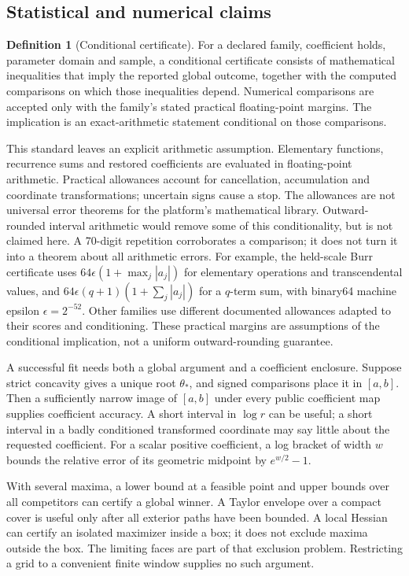 \documentclass[12pt]{article}
\theoremstyle{definition}
\newtheorem{definition}[theorem]{Definition}
\theoremstyle{remark}
\begin{document}
\subsection{Statistical and numerical claims}
\begin{definition}[Conditional certificate]
For a declared family, coefficient holds, parameter domain and sample, a
conditional certificate consists of mathematical inequalities that imply the
reported global outcome, together with the computed comparisons on which
those inequalities depend. Numerical comparisons are accepted only with the
family's stated practical floating-point margins. The implication is an
exact-arithmetic statement conditional on those comparisons.
\end{definition}
This standard leaves an explicit arithmetic assumption. Elementary functions,
recurrence sums and restored coefficients are evaluated in floating-point
arithmetic. Practical allowances account for cancellation, accumulation and
coordinate transformations; uncertain signs cause a stop. The allowances are
not universal error theorems for the platform's mathematical library.
Outward-rounded interval arithmetic would remove some of this conditionality,
but is not claimed here. A 70-digit repetition corroborates a comparison; it
does not turn it into a theorem about all arithmetic errors.
For example, the held-scale Burr certificate uses $64\epsilon(1+\max_j|a_j|)$
for elementary operations and transcendental values, and
$64\epsilon(q+1)(1+\sum_j|a_j|)$ for a $q$-term sum, with binary64
machine epsilon $\epsilon=2^{-52}$. Other families use different documented
allowances adapted to their scores and conditioning. These practical
margins are assumptions of the conditional implication, not a uniform
outward-rounding guarantee.

A successful fit needs both a global argument and a coefficient enclosure.
Suppose strict concavity gives a unique root $\theta_*$, and signed comparisons
place it in $[a,b]$. Then a sufficiently narrow image of $[a,b]$ under every
public coefficient map supplies coefficient accuracy. A short interval in
$\log r$ can be useful; a short interval in a badly conditioned transformed
coordinate may say little about the requested coefficient. For a scalar
positive coefficient, a log bracket of width $w$ bounds the relative error of
its geometric midpoint by $e^{w/2}-1$.

With several maxima, a lower bound at a feasible point and upper bounds over
all competitors can certify a global winner. A Taylor envelope over a compact
cover is useful only after all exterior paths have been bounded. A local
Hessian can certify an isolated maximizer inside a box; it does not exclude
maxima outside the box. The limiting faces are part of that exclusion
problem. Restricting a grid to a convenient finite window supplies no such
argument.
\end{document}
